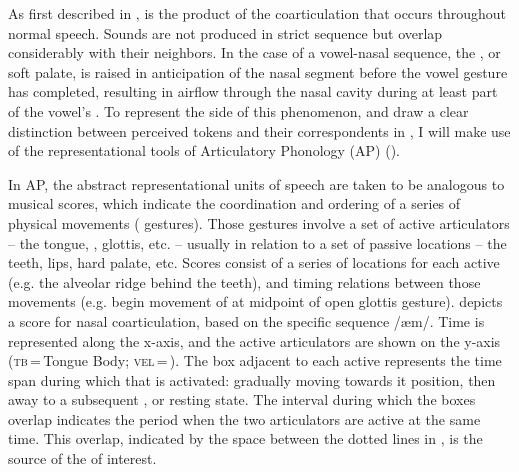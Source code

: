 As first described in ,
  is the product of the coarticulation that
occurs throughout normal speech. Sounds are not produced in strict
sequence but overlap considerably with their neighbors. In the case
of a vowel-nasal sequence, the , or soft palate, is raised in
anticipation of the nasal segment before the vowel gesture has completed,
resulting in airflow through the nasal cavity during at least part
of the vowel's . To represent the  side of this
phenomenon, and draw a clear distinction between perceived tokens
and their correspondents in , I will make use of the representational
tools of Articulatory Phonology (AP) (\citealt{Browman1986,Browman1990}). 

In AP, the abstract representational units of speech are taken to
be analogous to musical scores, which indicate the coordination and
ordering of a series of physical movements ( gestures).
Those gestures involve a set of active articulators – the tongue,
, glottis, etc. – usually in relation to a set of passive 
locations – the teeth, lips, hard palate, etc. Scores consist of a
series of  locations for each active  (e.g. the
alveolar ridge behind the teeth), and timing relations between those
movements (e.g. begin movement of  at midpoint of open
glottis gesture).  depicts a 
score for nasal coarticulation, based on the specific sequence {/æm/}.
Time is represented along the x-axis, and the active articulators
are shown on the y-axis ({\scshape tb}\,=\,Tongue Body; {\scshape vel}\,=\,). The box adjacent
to each active  represents the time span during which that
 is activated: gradually moving towards it  position,
then away to a subsequent , or resting state. The interval during
which the boxes overlap indicates the period when the two articulators
are active at the same time. This overlap, indicated by the space
between the dotted lines in , is
the source of the  of interest. 

